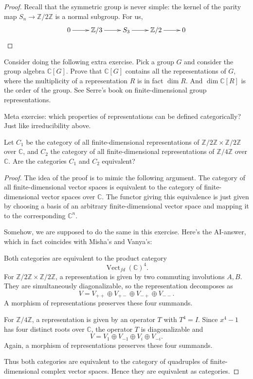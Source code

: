 \begin{proof}
Recall that the symmetric group
is never simple: the kernel
of the parity map $S_n \to \mathbb{Z}/2\mathbb{Z}$
is a normal subgroup. For us,
$$
\xymatrix{
0\ar[r]
&\mathbb{Z}/3\ar[r]
&S_3\ar[r]
&\mathbb{Z}/2\ar[r]
&0
}
$$

\end{proof}

\noindent
Consider doing the following
extra exercise. Pick
a group $G$ and 
consider the group algebra
$\mathbb{C}[G]$. Prove
that $\mathbb{C}[G]$ contains
all the representations of $G$,
where the multiplicity of a representation
$R$ is in fact $\dim R$.
And $\dim \mathbb{C}[R]$
is the order of the group.
See Serre's book on finite-dimensional
group representations.

Meta exercise: which
properties of representations can
be defined categorically? Just
like irreducibility above.

\begin{exercise}
\label{exercise-z2x-z2-vs-z4-reps}
Let $C_1$ be the category of all
finite-dimensional representations of
$\mathbb{Z}/2\mathbb{Z}\times\mathbb{Z}/2\mathbb{Z}$
over $\mathbb{C}$, and $C_2$ the category of
all finite-dimensional representations of
$\mathbb{Z}/4\mathbb{Z}$ over $\mathbb{C}$.
Are the categories $C_1$ and $C_2$
equivalent?
\end{exercise}

\begin{proof}
The idea of the proof is to mimic
the following argument. The
category of all finite-dimensional
vector spaces is equivalent
to the category of finite-dimensional
vector spaces over $\mathbb{C}$.
The functor giving this equivalence
is just given by choosing
a basis of an arbitrary finite-dimensional
vector space and mapping it
to the corresponding $\mathbb{C}^n$.

Somehow, we are supposed to do the same in
this exercise. Here's the AI-answer,
which in fact coincides with Misha's and
Vanya's:

Both categories are equivalent to the product
category
$$
\operatorname{Vect}_{fd}(\mathbb{C})^4.
$$
For $\mathbb{Z}/2\mathbb{Z}\times
\mathbb{Z}/2\mathbb{Z}$, a representation is
given by two commuting involutions $A,B$.
They are simultaneously diagonalizable, so
the representation decomposes as
$$
V=
V_{++}\oplus V_{+-}\oplus V_{-+}
\oplus V_{--}.
$$
A morphism of representations preserves
these four summands.

For $\mathbb{Z}/4\mathbb{Z}$, a
representation is given by an operator $T$
with $T^4=I$. Since $x^4-1$ has four distinct
roots over $\mathbb{C}$, the operator $T$ is
diagonalizable and
$$
V=
V_1\oplus V_{-1}\oplus V_i\oplus V_{-i}.
$$
Again, a morphism of representations
preserves these four summands.

Thus both categories are equivalent to the
category of quadruples of finite-dimensional
complex vector spaces. Hence they are
equivalent as categories.
\end{proof}

